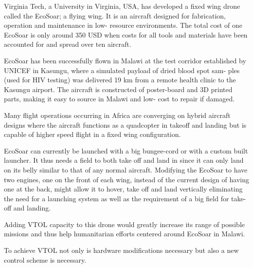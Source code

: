 Virginia Tech, a University in Virginia, USA, has developed a fixed wing drone called the EcoSoar; a flying wing.
It is an aircraft designed for fabrication, operation and maintenance in low-
resource environments.
The total cost of one EcoSoar is only around 350 USD when costs for all tools and materials have been accounted for and spread over ten aircraft.

EcoSoar has been successfully flown in Malawi at
the test corridor established by UNICEF in Kasungu,
where a simulated payload of dried blood spot sam-
ples (used for HIV testing) was delivered 19 km from
a remote health clinic to the Kasungu airport. The
aircraft is constructed of poster-board and 3D printed
parts, making it easy to source in Malawi and low-
cost to repair if damaged.

Many flight operations occurring in Africa are converging on hybrid aircraft designs where the aircraft functions as a quadcopter in takeoff and landing but is capable of higher speed flight in a fixed wing configuration.

EcoSoar can currently be launched with a big bungee-cord or with a custom built launcher. It thus needs a field to both take off and land in since it can only land on its belly similar to that of any normal aircraft.
Modifying the EcoSoar to have two engines, one on the front of each wing, instead of the current design of having one at the back, might allow it to hover, take off and land vertically eliminating the need for a launching system as well as the requirement of a big field for take-off and landing.

Adding VTOL capacity to this drone would greatly increase its range of possible missions and thus help humanitarian efforts centered around EcoSoar in Malawi.

To achieve VTOL not only is hardware modifications necessary but also a new control scheme is necessary.